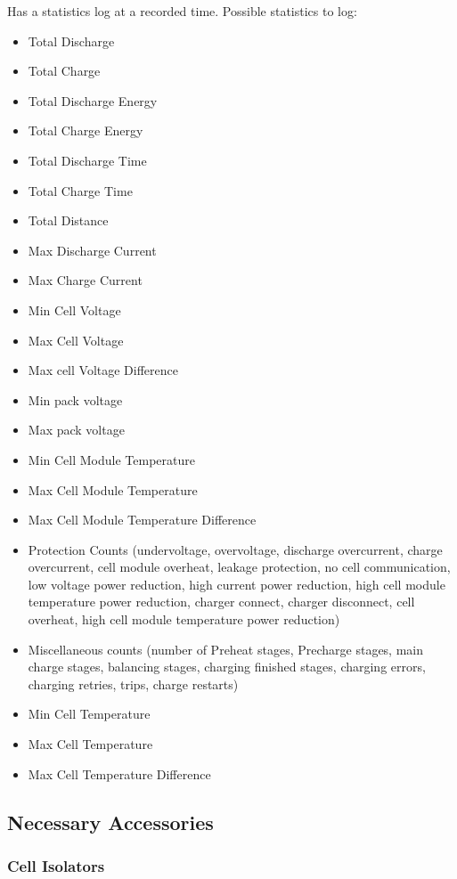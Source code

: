 Has a statistics log at a recorded time. Possible statistics to log:
\begin{itemize}
	\item Total Discharge
	\item Total Charge
	\item Total Discharge Energy
	\item Total Charge Energy
	\item Total Discharge Time
	\item Total Charge Time
	\item Total Distance
	\item Max Discharge Current
	\item Max Charge Current
	\item Min Cell Voltage
	\item Max Cell Voltage
	\item Max cell Voltage Difference
	\item Min pack voltage
	\item Max pack voltage
	\item Min Cell Module Temperature
	\item Max Cell Module Temperature
	\item Max Cell Module Temperature Difference
	\item Protection Counts (undervoltage, overvoltage, discharge overcurrent, charge overcurrent, cell module overheat, leakage protection, no cell communication, low voltage power reduction, high current power reduction, high cell module temperature power reduction, charger connect, charger disconnect, cell overheat, high cell module temperature power reduction)
	\item Miscellaneous counts (number of Preheat stages, Precharge stages, main charge stages, balancing stages, charging finished stages, charging errors, charging retries, trips, charge restarts)
	\item Min Cell Temperature
	\item Max Cell Temperature
	\item Max Cell Temperature Difference
\end{itemize}
\subsection{Necessary Accessories}

\subsubsection{Cell Isolators}


